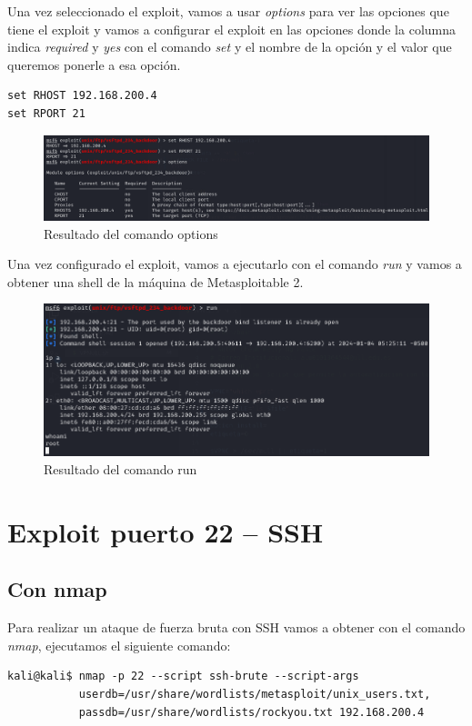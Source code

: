 \documentclass[11pt]{report}
\begin{document}
Una vez seleccionado el exploit, vamos a usar \emph{options} para ver las opciones que tiene el exploit y vamos a configurar el exploit en las opciones donde la columna indica \emph{required} y \emph{yes} con el comando 
\emph{set} y el nombre de la opción y el valor que queremos ponerle a esa opción.
\begin{verbatim}
set RHOST 192.168.200.4
set RPORT 21
\end{verbatim}

\begin{figure}[H]
  \centering
  \includegraphics[scale=0.51]{img/options_vsftpd.png}
  \caption{Resultado del comando options}
\end{figure}

Una vez configurado el exploit, vamos a ejecutarlo con el comando \emph{run} y vamos a obtener una shell de la máquina de Metasploitable 2.
\begin{figure}[H]
  \centering
  \includegraphics[scale=0.6]{img/run_vsftpd.png}
  \caption{Resultado del comando run}
\end{figure}

\newpage

\section{Exploit puerto 22 – SSH}
\subsection{Con nmap}
Para realizar un ataque de fuerza bruta con SSH vamos a obtener con el comando \emph{nmap}, ejecutamos el siguiente comando:
\begin{verbatim}
kali@kali$ nmap -p 22 --script ssh-brute --script-args 
           userdb=/usr/share/wordlists/metasploit/unix_users.txt,
           passdb=/usr/share/wordlists/rockyou.txt 192.168.200.4
\end{verbatim}
\end{document}
